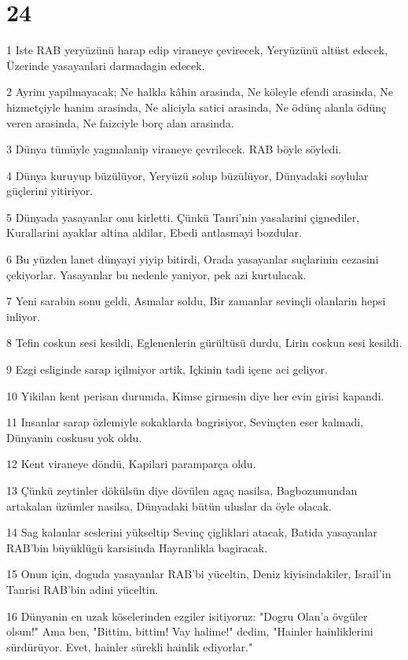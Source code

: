\chapter{24}

\par 1 Iste RAB yeryüzünü harap edip viraneye çevirecek, Yeryüzünü altüst edecek, Üzerinde yasayanlari darmadagin edecek.
\par 2 Ayrim yapilmayacak; Ne halkla kâhin arasinda, Ne köleyle efendi arasinda, Ne hizmetçiyle hanim arasinda, Ne aliciyla satici arasinda, Ne ödünç alanla ödünç veren arasinda, Ne faizciyle borç alan arasinda.
\par 3 Dünya tümüyle yagmalanip viraneye çevrilecek. RAB böyle söyledi.
\par 4 Dünya kuruyup büzülüyor, Yeryüzü solup büzülüyor, Dünyadaki soylular güçlerini yitiriyor.
\par 5 Dünyada yasayanlar onu kirletti. Çünkü Tanri'nin yasalarini çignediler, Kurallarini ayaklar altina aldilar, Ebedi antlasmayi bozdular.
\par 6 Bu yüzden lanet dünyayi yiyip bitirdi, Orada yasayanlar suçlarinin cezasini çekiyorlar. Yasayanlar bu nedenle yaniyor, pek azi kurtulacak.
\par 7 Yeni sarabin sonu geldi, Asmalar soldu, Bir zamanlar sevinçli olanlarin hepsi inliyor.
\par 8 Tefin coskun sesi kesildi, Eglenenlerin gürültüsü durdu, Lirin coskun sesi kesildi.
\par 9 Ezgi esliginde sarap içilmiyor artik, Içkinin tadi içene aci geliyor.
\par 10 Yikilan kent perisan durumda, Kimse girmesin diye her evin girisi kapandi.
\par 11 Insanlar sarap özlemiyle sokaklarda bagrisiyor, Sevinçten eser kalmadi, Dünyanin coskusu yok oldu.
\par 12 Kent viraneye döndü, Kapilari paramparça oldu.
\par 13 Çünkü zeytinler dökülsün diye dövülen agaç nasilsa, Bagbozumundan artakalan üzümler nasilsa, Dünyadaki bütün uluslar da öyle olacak.
\par 14 Sag kalanlar seslerini yükseltip Sevinç çigliklari atacak, Batida yasayanlar RAB'bin büyüklügü karsisinda Hayranlikla bagiracak.
\par 15 Onun için, doguda yasayanlar RAB'bi yüceltin, Deniz kiyisindakiler, Israil'in Tanrisi RAB'bin adini yüceltin.
\par 16 Dünyanin en uzak köselerinden ezgiler isitiyoruz: "Dogru Olan'a övgüler olsun!" Ama ben, "Bittim, bittim! Vay halime!" dedim, "Hainler hainliklerini sürdürüyor. Evet, hainler sürekli hainlik ediyorlar."
